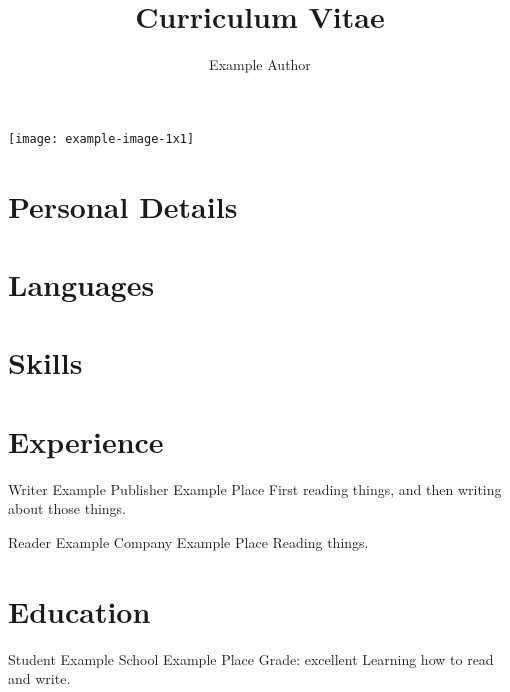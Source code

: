 \documentclass[
  xcolor=dvipsnames,
  primary=Blue,
  biblatex,
  signcv,
  14pt,a4paper
]{polycv}
\title{Curriculum Vitae}
\author{Example Author}
\begin{document}
\begin{polycvfirstpage}
\nocite{*}%
\begin{polycvsidebar}
\small

\texttt{[image: example-image-1x1]}\\[2ex]

\section{Personal Details}
\polycvlineaddress
\polycvlineemail
\polycvlinephone
\polycvlinemobile
\polycvlineorcid
\polycvlinegithub
\null

\section{Languages}

\section{Skills}

\end{polycvsidebar}%
\section{Experience}
{Writer}
{Example Publisher}
{Example Place}
{}
{First reading things, and then writing about those things.}

{Reader}
{Example Company}
{Example Place}
{}
{Reading things.}

\section{Education}
{Student}
{Example School}
{Example Place}
{Grade: excellent}
{Learning how to read and write.}


\end{polycvfirstpage}
\end{document}
